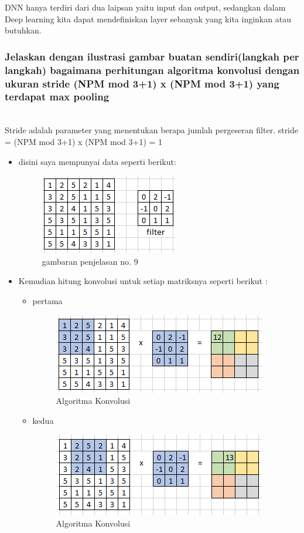 	DNN hanya terdiri dari dua laipsan yaitu input dan output, sedangkan dalam Deep learning kita dapat mendefiniskan layer sebanyak yang kita inginkan atau butuhkan.

\subsubsection{Jelaskan dengan ilustrasi gambar buatan sendiri(langkah per langkah) bagaimana perhitungan algoritma konvolusi dengan ukuran stride (NPM mod 3+1) x (NPM mod 3+1) yang terdapat max pooling} 
\hfill\\
Stride adalah parameter yang menentukan berapa jumlah pergeseran filter.
stride = (NPM mod 3+1) x (NPM mod 3+1) = 1
\begin{itemize}
\item disini saya mempunyai data seperti berikut:
\begin{figure}[H]
	\centering
	\includegraphics[scale=0.5]{figures/1174083/figures7/10.png}
	\caption{gambaran penjelasan no. 9}
\end{figure}

\item Kemudian hitung konvolusi untuk setiap matriksnya seperti berikut :
	\begin{itemize}
		\item pertama
			\begin{figure}[H]
				\centering
				\includegraphics[scale=1]{figures/1174083/figures7/11.png}
				\caption{Algoritma Konvolusi}
			\end{figure}

		\item kedua
			\begin{figure}[H]
				\centering
				\includegraphics[scale=1]{figures/1174083/figures7/12.png}
				\caption{Algoritma Konvolusi}
			\end{figure}


\end{itemize}
\end{itemize}
